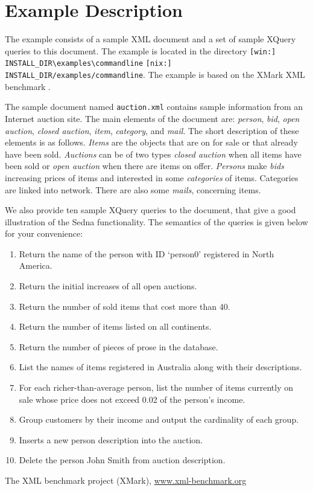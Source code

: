\documentclass[a4paper,12pt]{article}
\begin{document}
\section{Example Description}
\label{sec:example-description}
The example consists of a sample XML document and a set of sample XQuery queries to this document. The example is located in the directory \verb![win:] INSTALL_DIR\examples\commandline! \verb![nix:] INSTALL_DIR/examples/commandline!. The example is based on the XMark XML benchmark \cite{xmark}.

The sample document named \verb!auction.xml! contains sample information from an Internet auction site. The main elements of the document are: \emph{person}, \emph{bid}, \emph{open auction}, \emph{closed auction}, \emph{item}, \emph{category}, and \emph{mail}. The short description of these elements is as follows. \emph{Items} are the objects that are on for sale or that already have been sold. \emph{Auctions} can be of two types \emph{closed auction} when all items have been sold or \emph{open auction} when there are items on offer. \emph{Persons} make \emph{bids} increasing prices of items and interested in some \emph{categories} of items. Categories are linked into network. There are also some \emph{mails}, concerning items. 

We also provide ten sample XQuery queries to the document, that give a good illustration of the Sedna functionality. The semantics of the queries is given below for your convenience:
\begin{enumerate}
\item Return the name of the person with ID `person0' registered in North
 America.
\item Return the initial increases of all open auctions.
\item Return the number of sold items that cost more than 40.
\item Return the number of items listed on all continents.
\item Return the number of pieces of prose in the database.
\item List the names of items registered in Australia along with their
 descriptions.
\item For each richer-than-average person, list the number of items currently
 on sale whose price does not exceed 0.02 of the person's income.
\item Group customers by their income and output the cardinality of each group.
\item Inserts a new person description into the auction.
\item Delete the person John Smith from auction description.
\end{enumerate}

\begin{thebibliography}{9}
 The XML benchmark project (XMark), \url{www.xml-benchmark.org}
\end{thebibliography}
\end{document}
